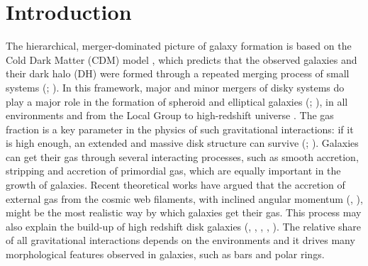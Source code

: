 \documentclass[12pt,preprint]{aastex}
\begin{document}




\section{Introduction} \label{intro}

The hierarchical, merger-dominated picture of galaxy formation is
based on the Cold Dark Matter (CDM) model \citep{Col00}, which
predicts that the observed galaxies and their dark halo (DH) were
formed through a repeated merging process of small systems
(\citealt{Del06}; \citealt{Gen08}). In this framework, major and minor
mergers of disky systems do play a major role in the formation of
spheroid and elliptical galaxies (\citealt{Naa07}; \citealt{Bou07}),
in all environments and from the Local Group to high-redshift universe
\citep{Con03}. The gas fraction is a key parameter in the physics of
such gravitational interactions: if it is high enough, an extended and
massive disk structure can survive (\citealt{Spr05}; \citealt{Rob08}).
Galaxies can get their gas through several interacting processes,
such as smooth accretion, stripping and accretion of primordial
gas, which are equally important in the growth of galaxies.  Recent
theoretical works have argued that the accretion of external gas from
the cosmic web filaments, with inclined angular momentum
(\citealt{Dav01}, \citealt{Sem05}), might be the most realistic way by
which galaxies get their gas. This process may also explain the
build-up of high redshift disk galaxies (\citealt{Ker05},
\citealt{Ker08}, \citealt{Bro08}, \citealt{Dek09},
\citealt{Bou09}). The relative share of all gravitational
interactions depends on the environments and it drives many
morphological features observed in galaxies, such as bars and polar
rings.
\end{document}
